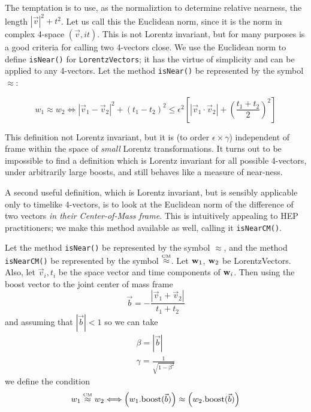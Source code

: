 \documentclass[twoside,12pt]{article}
\begin{document}
The temptation is to use, as the normaliztion to determine relative nearness,
the length $|\vec{v}|^2 + t^2$.  Let us call this the Euclidean norm, since it
is the norm in complex 4-space $(\vec{v}, i t)$.
This is not Lorentz invariant, but for
many purposes is a good criteria for calling two 4-vectors close.
We use the Euclidean norm to define {\tt isNear()} for {\tt LorentzVectors};
it has the virtue of simplicity and can be applied to any 4-vectors.
Let the method {\tt isNear()} be represented by the symbol $\approx$:

\begin{equation}
\label{eq:wisNear}
  w_1 \approx w_2 \Longleftrightarrow
  \left|
    \vec{v}_1 - \vec{v}_2
  \right| ^2
  + (t_1 - t_2)^2 \leq
  \epsilon^2
  \left[
    \left|
      \vec{v}_1 \cdot \vec{v}_2
    \right|
    +
    \left(
      \frac{t_1 + t_2}{2}
    \right)^2
  \right]
\end{equation}

This definition not Lorentz invariant, but it
is (to order $\epsilon \times \gamma$) independent of frame
within the space of {\em small} Lorentz transformations.
It turns out to be impossible to find a definition which is
Lorentz invariant for all possible 4-vectors, under arbitrarily large
boosts, and still behaves like a measure of near-ness.

A second useful definition, which is Lorentz invariant, but is
sensibly applicable only to timelike 4-vectors,
is to look at the Euclidean norm of the difference of two vectors
{\em in their Center-of-Mass frame}.
This is intuitively appealing to HEP practitioners;
we make this method available as well, calling it {\tt isNearCM()}.

Let the method {\tt isNear()} be represented by the symbol $\approx$,
and the method {\tt isNearCM()} be represented by the symbol
$\stackrel{\mbox{\tiny CM}}{\approx}$.
Let ${\bf w}_{1}$, ${\bf w}_{2}$ be LorentzVectors.
Also, let
$\vec{v}_i, t_i$ be the space vector and time components of ${\bf w}_{i}$.
Then using the boost vector to the joint center of mass frame
\begin{equation}
  \vec{b} = - \frac { \left| \vec{v}_1 + \vec{v}_2 \right| } { t_1 + t_2 }
\end{equation}
\noindent
and assuming that $|\vec{b}| < 1$ so we can take
\begin{eqnarray}
  \beta = |\vec{b}| \\
  \gamma = \frac{1} {\sqrt {1-\beta^2 } }
\end{eqnarray}
\noindent
we define the condition
\begin{eqnarray}
\label{eq:wisNearCM}
  w_1 \stackrel{\mbox{\tiny CM}}{\approx} w_2 \Longleftrightarrow
    \left( w_1\mbox{.boost}(\vec{b}) \right) \approx
    \left( w_2\mbox{.boost}(\vec{b}) \right)
\end{eqnarray}
\end{document}
